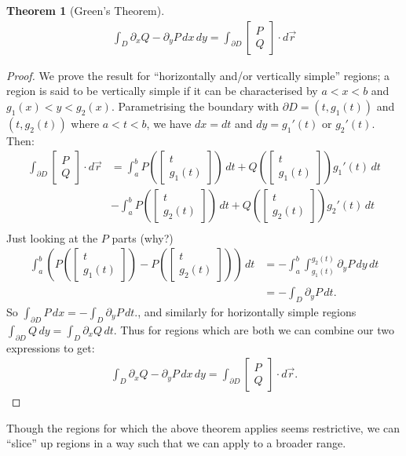 \documentclass{article}
\theoremstyle{definition}
\newtheorem{thm}{Theorem}[subsubsection]
\begin{document}
\begin{thm}[Green's Theorem]
	\begin{align*}
		\int_D\partial_xQ-\partial_yP\,dx\,dy=\int_{\partial D}\begin{bmatrix}P\\Q\end{bmatrix}\cdot d\vec r
	\end{align*}
\end{thm}
\begin{proof}
	We prove the result for ``horizontally and/or vertically simple'' regions; a region is said to be vertically simple if it can be characterised by $a<x<b$ and $g_1(x)<y<g_2(x)$. Parametrising the boundary with $\partial D=(t,g_1(t))$ and $(t,g_2(t))$ where $a<t<b$, we have $dx=dt$ and $dy=g_1'(t)$ or $g_2'(t)$. Then:
	\begin{align*}
		\int_{\partial D}\begin{bmatrix}P\\Q\end{bmatrix}\cdot d\vec r&=\int_a^bP\left(\begin{bmatrix}t\\g_1(t)\end{bmatrix}\right)\,dt+Q\left(\begin{bmatrix}t\\g_1(t)\end{bmatrix}\right)g_1'(t)\,dt\\
		&-\int_a^bP\left(\begin{bmatrix}t\\g_2(t)\end{bmatrix}\right)\,dt+Q\left(\begin{bmatrix}t\\g_2(t)\end{bmatrix}\right)g_2'(t)\,dt\\
	\end{align*}
	Just looking at the $P$ parts (why?)
	\begin{align*}
		\int_a^b\left(P\left(\begin{bmatrix}t\\g_1(t)\end{bmatrix}\right)-P\left(\begin{bmatrix}t\\g_2(t)\end{bmatrix}\right)\right)\,dt&=-\int_a^b\int_{g_1(t)}^{g_2(t)}\partial_yP\,dy\,dt\\
		&=-\int_D\partial_yP\,dt.
	\end{align*}
	So $\int_{\partial D}P\,dx=-\int_D\partial_yP\,dt.$, and similarly for horizontally simple regions $\int_{\partial D}Q\,dy=\int_D\partial_xQ\,dt$. Thus for regions which are both we can combine our two expressions to get:
	\begin{align*}
		\int_D\partial_xQ-\partial_yP\,dx\,dy=\int_{\partial D}\begin{bmatrix}P\\Q\end{bmatrix}\cdot d\vec r.
	\end{align*}
\end{proof}
Though the regions for which the above theorem applies seems restrictive, we can ``slice'' up regions in a way such that we can apply to a broader range.
\end{document}
